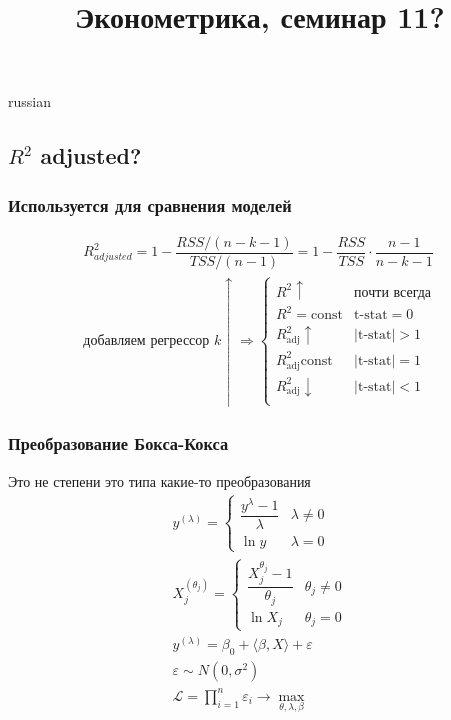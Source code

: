 \documentclass{article}
\begin{document}
\title{\foreignlanguage{russian}{Эконометрика, семинар 11?}}
\maketitle
\begin{otherlanguage*}{russian}
\subsection*{$R^2$ adjusted? }
\subsubsection*{Используется для сравнения моделей}
\begin{align*}
R^2_{adjusted} = 1 - \dfrac{RSS / (n - k - 1) }{TSS / (n - 1) } = 1 - \dfrac{RSS}{TSS} \cdot \dfrac{n-1}{n-k-1} \\
\text{добавляем регрессор } k \uparrow \Rightarrow \begin{cases} 
R^2 \uparrow & \text{почти всегда} \\
R^2 = \text{const} & \text{t-stat} = 0 \\
R^2_{\text{adj}} \uparrow & |\text{t-stat}| > 1 \\
R^2_{\text{adj}} \text{const} & |\text{t-stat}| =  1 \\
R^2_{\text{adj}} \downarrow & |\text{t-stat}| < 1 \\
\end{cases}
\end{align*}
\subsubsection*{Преобразование Бокса-Кокса}
Это не степени это типа какие-то преобразования
\begin{align*}
y^{(\lambda)} = \begin{cases} 
\dfrac{y^{\lambda} - 1 }{\lambda} & \lambda \ne 0 \\
\ln y & \lambda = 0 
\end{cases} \\
X_j^{(\theta_j)} = \begin{cases} 
\dfrac{X_j^{\theta_j} - 1}{\theta_j} & \theta_j \ne 0 \\
\ln X_j & \theta_j = 0 
\end{cases} \\
y^{(\lambda)} = \beta_0 + \langle \beta, X \rangle + \varepsilon \\
\varepsilon \sim N(0, \sigma^2) \\
\mathcal{L} = \prod_{i=1}^n  \varepsilon_i \rightarrow \max_{\theta, \lambda, \beta} \\
\end{align*}

\end{otherlanguage*}
\end{document}
